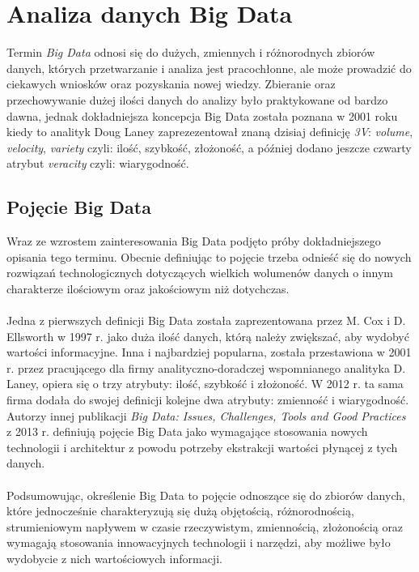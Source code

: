 \chapter{Analiza danych Big Data}

Termin \textit{Big Data} odnosi się do dużych, zmiennych i różnorodnych zbiorów danych, których przetwarzanie i analiza jest pracochłonne, ale może prowadzić do ciekawych wniosków oraz pozyskania nowej wiedzy. Zbieranie oraz przechowywanie dużej ilości danych do analizy było praktykowane od bardzo dawna, jednak dokładniejsza koncepcja Big Data została poznana w 2001 roku kiedy to analityk Doug Laney zaprezezentował znaną dzisiaj definicję \textit{3V}: \textit{volume}, \textit{velocity}, \textit{variety} czyli: ilość, szybkość, złożoność, a później dodano jeszcze czwarty atrybut \textit{veracity} czyli: wiarygodność.

\section{Pojęcie Big Data}
Wraz ze wzrostem zainteresowania Big Data podjęto próby dokładniejszego opisania tego terminu. Obecnie definiując to pojęcie trzeba odnieść się do nowych rozwiązań technologicznych dotyczących wielkich wolumenów danych o innym charakterze ilościowym oraz jakościowym niż dotychczas. \\
\\
Jedna z pierwszych definicji Big Data została zaprezentowana przez M. Cox i D. Ellsworth w 1997 r. jako duża ilość danych, którą należy zwiększać, aby wydobyć wartości informacyjne. Inna i najbardziej popularna, została przestawiona w 2001 r. przez pracującego dla firmy analityczno-doradczej wspomnianego analityka D. Laney, opiera się o trzy atrybuty: ilość, szybkość i złożoność. W 2012 r. ta sama firma dodała do swojej definicji kolejne dwa atrybuty: zmienność i wiarygodność. Autorzy innej publikacji \textit{Big Data: Issues, Challenges, Tools and Good Practices} z 2013 r. definiują pojęcie Big Data jako wymagające stosowania nowych technologii i architektur z powodu potrzeby ekstrakcji wartości płynącej z tych danych. \\
\\
Podsumowując, określenie Big Data to pojęcie odnoszące się do zbiorów danych, które jednocześnie charakteryzują się dużą objętością, różnorodnością, strumieniowym napływem w czasie rzeczywistym, zmiennością, złożonością oraz wymagają stosowania innowacyjnych technologii i narzędzi, aby możliwe było wydobycie z nich wartościowych informacji.

